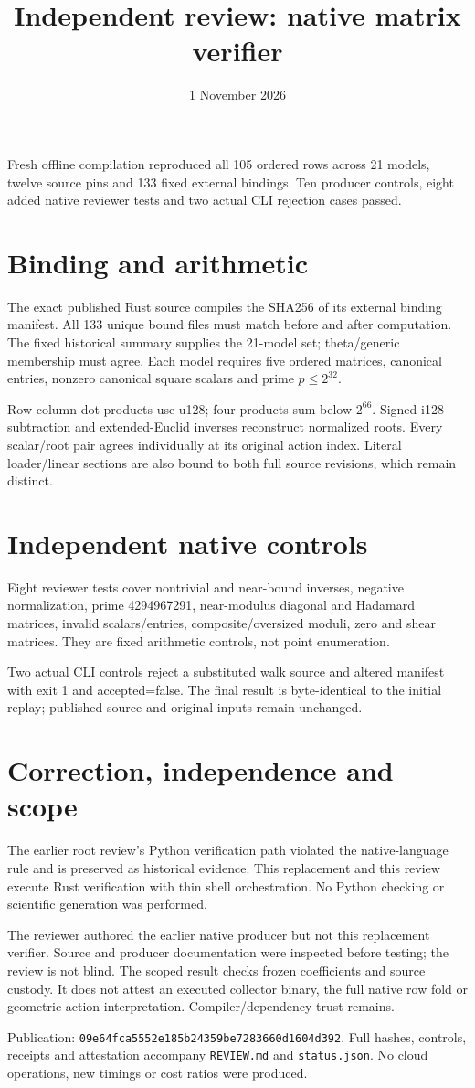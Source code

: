 \documentclass[10pt]{article}\usepackage[margin=0.8in]{geometry}\usepackage[T1]{fontenc}\usepackage{lmodern,amsmath,hyperref}
\title{Independent review: native matrix verifier}\date{1 November 2026}
\begin{document}
\maketitle
Fresh offline compilation reproduced all 105 ordered rows across 21 models, twelve source pins and 133 fixed external bindings. Ten producer controls, eight added native reviewer tests and two actual CLI rejection cases passed.
\section*{Binding and arithmetic}
The exact published Rust source compiles the SHA256 of its external binding manifest. All 133 unique bound files must match before and after computation. The fixed historical summary supplies the 21-model set; theta/generic membership must agree. Each model requires five ordered matrices, canonical entries, nonzero canonical square scalars and prime $p\le2^{32}$.

Row-column dot products use u128; four products sum below $2^{66}$. Signed i128 subtraction and extended-Euclid inverses reconstruct normalized roots. Every scalar/root pair agrees individually at its original action index. Literal loader/linear sections are also bound to both full source revisions, which remain distinct.
\section*{Independent native controls}
Eight reviewer tests cover nontrivial and near-bound inverses, negative normalization, prime 4294967291, near-modulus diagonal and Hadamard matrices, invalid scalars/entries, composite/oversized moduli, zero and shear matrices. They are fixed arithmetic controls, not point enumeration.

Two actual CLI controls reject a substituted walk source and altered manifest with exit 1 and accepted=false. The final result is byte-identical to the initial replay; published source and original inputs remain unchanged.
\section*{Correction, independence and scope}
The earlier root review's Python verification path violated the native-language rule and is preserved as historical evidence. This replacement and this review execute Rust verification with thin shell orchestration. No Python checking or scientific generation was performed.

The reviewer authored the earlier native producer but not this replacement verifier. Source and producer documentation were inspected before testing; the review is not blind. The scoped result checks frozen coefficients and source custody. It does not attest an executed collector binary, the full native row fold or geometric action interpretation. Compiler/dependency trust remains.

Publication: \texttt{09e64fca5552e185b24359be7283660d1604d392}. Full hashes, controls, receipts and attestation accompany \texttt{REVIEW.md} and \texttt{status.json}. No cloud operations, new timings or cost ratios were produced.
\end{document}
